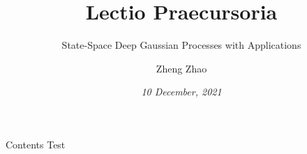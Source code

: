 \documentclass[seriffont, cmap=Beijing, 10pt]{zz}
\title{Lectio Praecursoria}
\subtitle{State-Space Deep Gaussian Processes with Applications}
\date[Nov 30, 2021]{\textit{10 December, 2021}}
\institute{\textit{Aalto University}}
\author[Zheng Zhao]{Zheng Zhao}
\begin{document}
\titlepage

\begin{frame}{Contents}
	Test
\end{frame}
\end{document}
